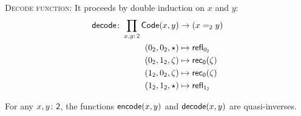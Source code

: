 \textsc{Decode function:} It proceeds by double induction on $x$ and $y$:
    \begin{align*}
        \fun{decode}\colon\prod_{x,y\colon\fun2}\fun{Code}(x,y)
            &\to(x\eq{\fun2}y)\\
        (0_{\fun2},0_{\fun2},\fun\star)
            &\mapsto\fun{refl}_{0_{\fun2}}\\
        (0_{\fun2},1_{\fun2},\zeta)
            &\mapsto\fun{rec}_{\fun0}(\zeta)\\
        (1_{\fun2},0_{\fun2},\zeta)
            &\mapsto\fun{rec}_{\fun0}(\zeta)\\
        (1_{\fun2},1_{\fun2},\fun\star)
            &\mapsto\fun{refl}_{1_{\fun2}}
    \end{align*}

\begin{thm}\label{thm:bool-equality}
    For any $x,y\colon\fun2$, the functions $\mathsf{encode}(x,y)$ and $\mathsf{decode}(x,y)$ are quasi-inverses.
\end{thm}

